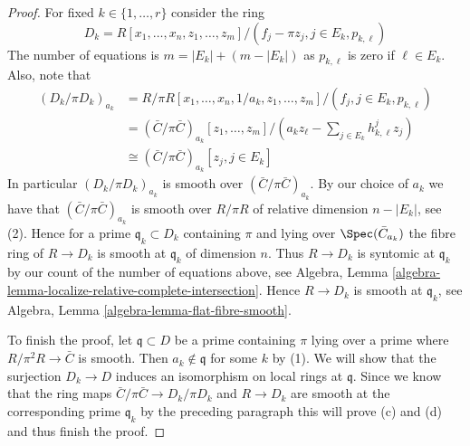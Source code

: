 \begin{proof}
\medskip\noindent
For fixed $k \in \{1, \ldots, r\}$ consider the ring
$$
D_k = R[x_1, \ldots, x_n, z_1, \ldots, z_m]/
(f_j - \pi z_j, j \in E_k, p_{k, \ell})
$$
The number of equations is $m = |E_k| + (m - |E_k|)$ as $p_{k, \ell}$
is zero if $\ell \in E_k$. Also, note that
\begin{align*}
(D_k/\pi D_k)_{a_k}
& =
R/\pi R[x_1, \ldots, x_n, 1/a_k, z_1, \ldots, z_m]/
(f_j, j \in E_k, p_{k, \ell}) \\
& =
(\bar C/\pi \bar C)_{a_k}[z_1, \ldots, z_m]/
(a_kz_\ell - \sum\nolimits_{j \in E_k} h_{k, \ell}^j z_j) \\
& \cong
(\bar C/\pi \bar C)_{a_k}[z_j, j \in E_k]
\end{align*}
In particular $(D_k/\pi D_k)_{a_k}$ is smooth over $(\bar C/\pi \bar C)_{a_k}$.
By our choice of $a_k$ we have that $(\bar C/\pi \bar C)_{a_k}$ is smooth
over $R/\pi R$ of relative dimension $n - |E_k|$, see (2). Hence for a prime
$\mathfrak q_k \subset D_k$ containing $\pi$ and lying over
$\Spec(\bar C_{a_k})$ the fibre ring of $R \to D_k$
is smooth at $\mathfrak q_k$ of dimension $n$. Thus $R \to D_k$ is syntomic
at $\mathfrak q_k$ by our count of the number of equations above, see
Algebra, Lemma \ref{algebra-lemma-localize-relative-complete-intersection}.
Hence $R \to D_k$ is smooth at $\mathfrak q_k$, see
Algebra, Lemma \ref{algebra-lemma-flat-fibre-smooth}.

\medskip\noindent
To finish the proof, let $\mathfrak q \subset D$ be a prime
containing $\pi$ lying over a prime where $R/\pi^2 R \to \bar C$
is smooth. Then $a_k \not \in \mathfrak q$ for some $k$ by (1).
We will show that the surjection $D_k \to D$ induces
an isomorphism on local rings at $\mathfrak q$. Since we know that
the ring maps $\bar C/\pi \bar C \to D_k/\pi D_k$ and
$R \to D_k$ are smooth at the corresponding prime $\mathfrak q_k$
by the preceding paragraph this will prove (c) and (d) and thus
finish the proof.


\end{proof}
